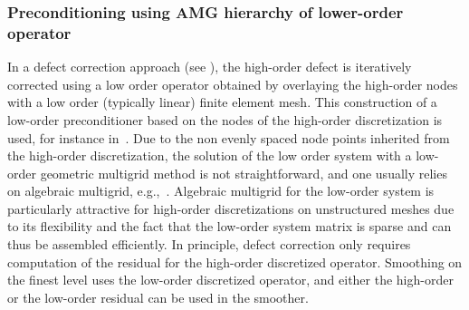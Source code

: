 \documentclass[smallcondensed,final]{svjour3}     %
\newcommand{\gsnote}[1]{\textcolor{blue}{GS: #1}}
\begin{document}
\subsubsection{Preconditioning using AMG hierarchy of lower-order operator} \label{subsec:low}
In a defect correction approach (see
\cite{TrottenbergOosterleeSchuller01, Hackbusch85}), the high-order
defect is iteratively corrected using a low order operator obtained by
overlaying the high-order nodes with a low order (typically linear)
finite element mesh.  This construction of a low-order preconditioner
based on the nodes of the high-order discretization
is used, for instance in~\cite{Brown10, Kim07, DevilleMund90,
  HeysManteuffelMcCormickEtAl05}.
%
Due to the non evenly spaced node points inherited from the high-order
discretization, the solution of the low order system with a low-order
geometric multigrid method is not straightforward, and one usually
relies on algebraic multigrid, e.g.,~\cite{Brown10,
  HeysManteuffelMcCormickEtAl05}. Algebraic multigrid for the
low-order system is particularly attractive for high-order
discretizations on unstructured meshes due to its flexibility and the
fact that the low-order system matrix is sparse and can thus be
assembled efficiently.
%
In principle, defect correction only requires computation of the
residual for the high-order discretized operator. Smoothing on the
finest level uses the low-order discretized operator, and either the
high-order or the low-order residual can be used in the smoother.



\end{document}

